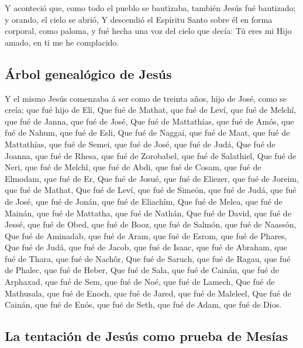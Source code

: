  Y aconteció que, como todo el pueblo se bautizaba,
también Jesús fué bautizado; y orando, el cielo se abrió,
 Y descendió el Espíritu Santo sobre él en forma
corporal, como paloma, y fué hecha una voz del cielo que decía: Tú eres
mi Hijo amado, en ti me he complacido.

\hypertarget{uxe1rbol-genealuxf3gico-de-jesuxfas}{%
\subsection{Árbol genealógico de
Jesús}\label{uxe1rbol-genealuxf3gico-de-jesuxfas}}

 Y el mismo Jesús comenzaba á ser como de treinta años,
hijo de José, como se creía; que fué hijo de Elí,  Que
fué de Mathat, que fué de Leví, que fué de Melchî, que fué de Janna, que
fué de José,  Que fué de Mattathías, que fué de Amós, que
fué de Nahum, que fué de Esli,  Que fué de Naggai, que
fué de Maat, que fué de Mattathías, que fué de Semei, que fué de José,
que fué de Judá,  Que fué de Joanna, que fué de Rhesa,
que fué de Zorobabel, que fué de Salathiel,  Que fué de
Neri, que fué de Melchî, que fué de Abdi, que fué de Cosam, que fué de
Elmodam, que fué de Er,  Que fué de Josué, que fué de
Eliezer, que fué de Joreim, que fué de Mathat,  Que fué
de Leví, que fué de Simeón, que fué de Judá, que fué de José, que fué de
Jonán, que fué de Eliachîm,  Que fué de Melea, que fué de
Mainán, que fué de Mattatha, que fué de Nathán,  Que fué
de David, que fué de Jessé, que fué de Obed, que fué de Booz, que fué de
Salmón, que fué de Naassón,  Que fué de Aminadab, que fué
de Aram, que fué de Esrom, que fué de Phares,  Que fué de
Judá, que fué de Jacob, que fué de Isaac, que fué de Abraham, que fué de
Thara, que fué de Nachôr,  Que fué de Saruch, que fué de
Ragau, que fué de Phalec, que fué de Heber,  Que fué de
Sala, que fué de Cainán, que fué de Arphaxad, que fué de Sem, que fué de
Noé, que fué de Lamech,  Que fué de Mathusala, que fué de
Enoch, que fué de Jared, que fué de Maleleel,  Que fué de
Cainán, que fué de Enós, que fué de Seth, que fué de Adam, que fué de
Dios.

\hypertarget{la-tentaciuxf3n-de-jesuxfas-como-prueba-de-mesuxedas}{%
\subsection{La tentación de Jesús como prueba de
Mesías}\label{la-tentaciuxf3n-de-jesuxfas-como-prueba-de-mesuxedas}}

